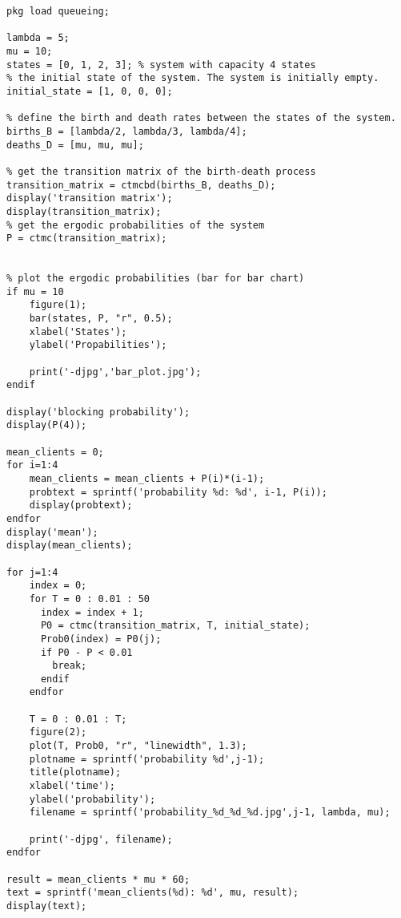 \documentclass[12pt]{article}
\begin{document}
\begin{enumerate}
\begin{lstlisting}
pkg load queueing;

lambda = 5;
mu = 10;
states = [0, 1, 2, 3]; % system with capacity 4 states
% the initial state of the system. The system is initially empty.
initial_state = [1, 0, 0, 0];

% define the birth and death rates between the states of the system.
births_B = [lambda/2, lambda/3, lambda/4];
deaths_D = [mu, mu, mu];

% get the transition matrix of the birth-death process
transition_matrix = ctmcbd(births_B, deaths_D);
display('transition matrix');
display(transition_matrix);
% get the ergodic probabilities of the system
P = ctmc(transition_matrix);


% plot the ergodic probabilities (bar for bar chart)
if mu = 10
	figure(1);
	bar(states, P, "r", 0.5);
	xlabel('States');
	ylabel('Propabilities');
	
	print('-djpg','bar_plot.jpg');
endif

display('blocking probability');
display(P(4));

mean_clients = 0;
for i=1:4
	mean_clients = mean_clients + P(i)*(i-1);
	probtext = sprintf('probability %d: %d', i-1, P(i));
	display(probtext);
endfor
display('mean');
display(mean_clients);

for j=1:4
	index = 0;
	for T = 0 : 0.01 : 50
	  index = index + 1;
	  P0 = ctmc(transition_matrix, T, initial_state);
	  Prob0(index) = P0(j);
	  if P0 - P < 0.01
	    break;
	  endif
	endfor

	T = 0 : 0.01 : T;
	figure(2);
	plot(T, Prob0, "r", "linewidth", 1.3);
	plotname = sprintf('probability %d',j-1);
	title(plotname);
	xlabel('time');
	ylabel('probability');
	filename = sprintf('probability_%d_%d_%d.jpg',j-1, lambda, mu);

	print('-djpg', filename);
endfor

result = mean_clients * mu * 60;
text = sprintf('mean_clients(%d): %d', mu, result);
display(text);

\end{lstlisting}


\end{enumerate}
\end{document}
